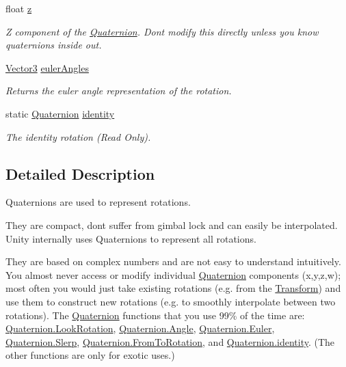 \begin{DoxyCompactItemize}
float \mbox{\hyperlink{class_lua_1_1_quaternion_ac26c0a2710dd86783dee62c8645ee55c}{z}}
\begin{DoxyCompactList}\small\item\em Z component of the \mbox{\hyperlink{class_lua_1_1_quaternion}{Quaternion}}. Don\textquotesingle{}t modify this directly unless you know quaternions inside out. \end{DoxyCompactList}\item 
\mbox{\hyperlink{class_lua_1_1_vector3}{Vector3}} \mbox{\hyperlink{class_lua_1_1_quaternion_ac50cf6b67c4cb0363b834b7054cdd5fa}{euler\+Angles}}
\begin{DoxyCompactList}\small\item\em Returns the euler angle representation of the rotation. \end{DoxyCompactList}\item 
static \mbox{\hyperlink{class_lua_1_1_quaternion}{Quaternion}} \mbox{\hyperlink{class_lua_1_1_quaternion_ac7d56f4c2496af59e66550e35bff614c}{identity}}
\begin{DoxyCompactList}\small\item\em The identity rotation (Read Only). \end{DoxyCompactList}\end{DoxyCompactItemize}


\subsection{Detailed Description}
Quaternions are used to represent rotations. 

They are compact, don\textquotesingle{}t suffer from gimbal lock and can easily be interpolated. Unity internally uses Quaternions to represent all rotations.

They are based on complex numbers and are not easy to understand intuitively. You almost never access or modify individual \mbox{\hyperlink{class_lua_1_1_quaternion}{Quaternion}} components (x,y,z,w); most often you would just take existing rotations (e.\+g. from the \mbox{\hyperlink{class_lua_1_1_transform}{Transform}}) and use them to construct new rotations (e.\+g. to smoothly interpolate between two rotations). The \mbox{\hyperlink{class_lua_1_1_quaternion}{Quaternion}} functions that you use 99\% of the time are\+: \mbox{\hyperlink{class_lua_1_1_quaternion_a7a17f92fd9d83a8b472db78d5cb74642}{Quaternion.\+Look\+Rotation}}, \mbox{\hyperlink{class_lua_1_1_quaternion_a4094309a8c66c50017bd92ffdfeb3bfd}{Quaternion.\+Angle}}, \mbox{\hyperlink{class_lua_1_1_quaternion_ac7134c2bdc28902fc519d42b7b803d9f}{Quaternion.\+Euler}}, \mbox{\hyperlink{class_lua_1_1_quaternion_a8848906e3924791706bc0bc853a4572b}{Quaternion.\+Slerp}}, \mbox{\hyperlink{class_lua_1_1_quaternion_a78b8152d55e05c4b35a74ed09eae9d41}{Quaternion.\+From\+To\+Rotation}}, and \mbox{\hyperlink{class_lua_1_1_quaternion_ac7d56f4c2496af59e66550e35bff614c}{Quaternion.\+identity}}. (The other functions are only for exotic uses.)

